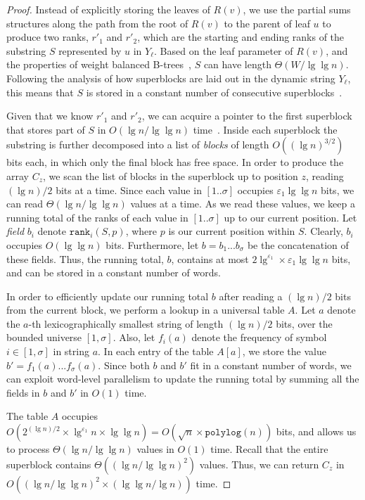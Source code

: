 \documentclass{llncs}
\def\idtt#1{\ensuremath{\mathtt{#1}}}
\def\rankop{\idtt{rank}}
\def\polylog{\idtt{polylog}}
\begin{document}
\begin{proof}
Instead of explicitly storing the leaves of $R(v)$, we use the partial
sums structures along the path from the root of $R(v)$ to the parent
of leaf $u$ to produce two ranks, $r'_1$ and $r'_2$, which are the
starting and ending ranks of the substring $S$ represented by $u$ in
$Y_\ell$.  Based on the leaf parameter of $R(v)$, and the properties
of weight balanced B-trees~\cite{AV03}, $S$ can have length
$\Theta(W/\lg\lg n)$.  Following the analysis of how superblocks are
laid out in the dynamic string $Y_\ell$, this means that $S$ is stored
in a constant number of consecutive superblocks~\cite[Section
  4]{HM10a}.

Given that we know $r'_1$ and $r'_2$, we can acquire a pointer to the
first superblock that stores part of $S$ in $O(\lg n / \lg \lg n)$
time~\cite[Lemma 7]{HM10a}.  Inside each superblock the substring is
further decomposed into a list of \emph{blocks} of length $O((\lg
n)^{3/2})$ bits each, in which only the final block has free space.
In order to produce the array $C_z$, we scan the list of blocks in the
superblock up to position $z$, reading $(\lg n)/2$ bits at a time.
Since each value in $[1..\sigma]$ occupies $\varepsilon_1 \lg \lg n$
bits, we can read $\Theta(\lg n / \lg \lg n)$ values at a time.  As we
read these values, we keep a running total of the ranks of each value
in $[1..\sigma]$ up to our current position.  Let \emph{field} $b_i$
denote $\rankop_i(S,p)$, where $p$ is our current position within $S$.
Clearly, $b_i$ occupies $O(\lg \lg n)$ bits.  Furthermore, let $b =
b_1 ... b_\sigma$ be the concatenation of these fields.  Thus, the
running total, $b$, contains at most $2\lg^{\varepsilon_1} \times
\varepsilon_1 \lg \lg n$ bits, and can be stored in a constant number
of words.

In order to efficiently update our running total $b$ after reading a
$(\lg n)/2$ bits from the current block, we perform a lookup in a
universal table $A$.  Let $a$ denote the $a$-th lexicographically
smallest string of length $(\lg n)/2$ bits, over the bounded universe
$[1,\sigma]$.  Also, let $f_i(a)$ denote the frequency of symbol $i
\in [1,\sigma]$ in string $a$. In each entry of the table $A[a]$, we
store the value $b' = f_1(a)...f_\sigma(a)$.  Since both $b$ and $b'$
fit in a constant number of words, we can exploit word-level
parallelism to update the running total by summing all the fields in
$b$ and $b'$ in $O(1)$ time.

The table $A$ occupies $O(2^{(\lg n)/2} \times \lg^{\varepsilon_1} n
\times \lg \lg n) = O(\sqrt{n} \times \polylog(n))$ bits, and allows
us to process $\Theta(\lg n/\lg \lg n)$ values in $O(1)$ time.  Recall
that the entire superblock contains $\Theta((\lg n / \lg \lg n)^2)$
values.  Thus, we can return $C_z$ in $O((\lg n / \lg \lg n)^2 \times
(\lg \lg n / \lg n))$ time.
\end{proof}
\end{document}

